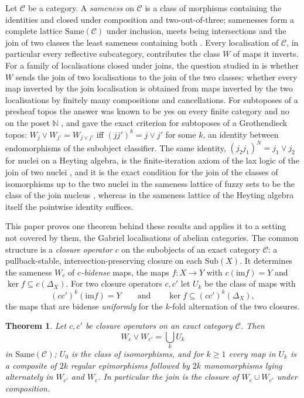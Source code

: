 \documentclass[11pt]{amsart}
\newtheorem{thm}{Theorem}[section]
\theoremstyle{definition}
\newcommand{\Same}{\mathrm{Same}}
\newcommand{\im}{\mathrm{im}}
\newcommand{\Sub}{\mathrm{Sub}}
\newcommand{\cC}{\mathcal C}
\begin{document}
Let $\cC$ be a category. A \emph{sameness} on $\cC$ is a class of morphisms
containing the identities and closed under composition and two-out-of-three;
samenesses form a complete lattice $\Same(\cC)$ under inclusion, meets being
intersections and the join of two classes the least sameness containing both
\cite{Same}. Every localisation of $\cC$, in particular every reflective
subcategory, contributes the class $W$ of maps it inverts. For a family of
localisations closed under joins, the question studied in
\cite{Topjoin,Finitejoin,Stabjoin} is whether $W$ sends the join of two
localisations to the join of the two classes: whether every map inverted by
the join localisation is obtained from maps inverted by the two
localisations by finitely many compositions and cancellations. For subtoposes
of a presheaf topos the answer was known to be yes on every finite category
\cite{Finitejoin} and no on the poset $\mathbb N$ \cite{Topjoin}, and
\cite{Stabjoin} gave the exact criterion for subtoposes of a Grothendieck
topos: $W_j\vee W_{j'}=W_{j\vee j'}$ iff $(jj')^k=j\vee j'$ for some $k$, an
identity between endomorphisms of the subobject classifier. The same
identity, $(j_2j_1)^N=j_1\vee j_2$ for nuclei on a Heyting algebra, is the
finite-iteration axiom of the lax logic of the join of two nuclei
\cite{Laxjoin}, and it is the exact condition for the join of the classes
of isomorphisms up to the two nuclei in the sameness lattice of fuzzy sets
to be the class of the join nucleus \cite{Fuzzysame}, whereas in the
sameness lattice of the Heyting algebra itself the pointwise identity
suffices.

This paper proves one theorem behind these results and applies it to a
setting not covered by them, the Gabriel localisations of abelian
categories. The common structure is a \emph{closure operator} $c$ on the
subobjects of an exact category $\cC$: a pullback-stable,
intersection-preserving closure on each $\Sub(X)$. It determines the
sameness $W_c$ of \emph{$c$-bidense} maps, the maps $f\colon X\to Y$ with
$c(\im f)=Y$ and $\ker f\subseteq c(\Delta_X)$. For two closure operators
$c,c'$ let $U_k$ be the class of maps with
\[
(cc')^k(\im f)=Y\qquad\text{and}\qquad\ker f\subseteq(cc')^k(\Delta_X),
\]
the maps that are bidense \emph{uniformly} for the $k$-fold alternation of
the two closures.

\begin{thm}\label{thm:A}
Let $c,c'$ be closure operators on an exact category $\cC$. Then
\[
W_c\vee W_{c'}=\bigcup_kU_k
\]
in $\Same(\cC)$; $U_0$ is the class of isomorphisms, and for $k\ge1$ every
map in $U_k$ is a composite of $2k$ regular epimorphisms followed by $2k$
monomorphisms lying alternately in $W_{c'}$ and $W_c$. In particular the
join is the closure of $W_c\cup W_{c'}$ under composition.
\end{thm}
\end{document}
